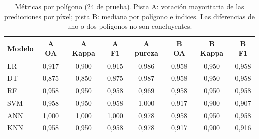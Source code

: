 \begin{table}[htbp]
 \centering
 \small
\setlength{\tabcolsep}{3.5pt}
 \caption{Métricas por polígono (24 de prueba). Pista A: votación mayoritaria de las predicciones por píxel; pista B: mediana por polígono e índices. Las diferencias de uno o dos polígonos no son concluyentes.}
 \label{tab:metricas_poligono}
 \begin{tabular}{lccccccc}
  \toprule
  Modelo & A OA & A Kappa & A F1 & A pureza & B OA & B Kappa & B F1 \\
  \midrule
  LR & 0{,}917 & 0{,}900 & 0{,}915 & 0{,}986 & 0{,}958 & 0{,}950 & 0{,}958 \\
  DT & 0{,}875 & 0{,}850 & 0{,}875 & 0{,}987 & 0{,}958 & 0{,}950 & 0{,}958 \\
  RF & 0{,}958 & 0{,}950 & 0{,}958 & 0{,}969 & 0{,}958 & 0{,}950 & 0{,}958 \\
  SVM & 0{,}958 & 0{,}950 & 0{,}958 & 1{,}000 & 0{,}917 & 0{,}900 & 0{,}907 \\
  ANN & 1{,}000 & 1{,}000 & 1{,}000 & 0{,}978 & 0{,}958 & 0{,}950 & 0{,}958 \\
  KNN & 0{,}958 & 0{,}950 & 0{,}958 & 0{,}978 & 0{,}917 & 0{,}900 & 0{,}916 \\
  \bottomrule
 \end{tabular}
\end{table}
